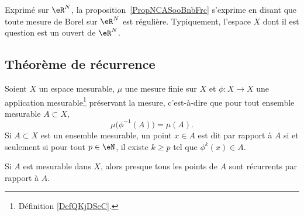 \begin{remark}      \label{RemooOAGCooRHpjxd}
	Exprimé sur \( \eR^N\), la proposition~\ref{PropNCASooBnbFrc} s'exprime en disant que toute mesure de Borel sur \( \eR^N\) est régulière. Typiquement, l'espace \( X\) dont il est question est un ouvert de \( \eR^N\).
\end{remark}

\subsection{Théorème de récurrence}

Soient \( X\) un espace mesurable, \( \mu\) une mesure finie sur \( X\) et \( \phi\colon X\to X\) une application mesurable\footnote{Définition \ref{DefQKjDSeC}.} préservant la mesure, c'est-à-dire que pour tout ensemble mesurable \( A\subset X\),
\begin{equation}
	\mu\big( \phi^{-1}(A) \big)=\mu(A).
\end{equation}
Si \( A\subset X\) est un ensemble mesurable, un point \( x\in A\) est dit  par rapport à \( A\) si et seulement si pour tout \( p\in \eN\), il existe \( k\geq p\) tel que \( \phi^k(x)\in A\).

\begin{theorem}     \label{ThoYnLNEL}
	Si \( A\) est mesurable dans \( X\), alors presque tous les points de \( A\) sont récurrents par rapport à \( A\).
\end{theorem}

